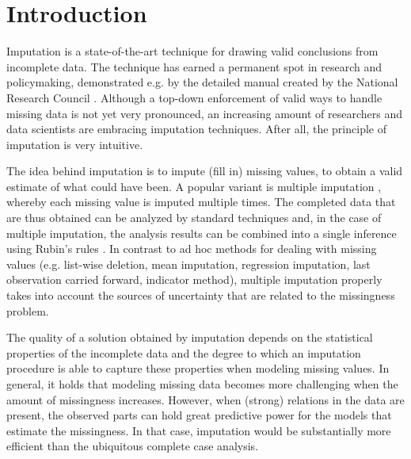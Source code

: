 \documentclass[bimj,fleqn]{w-art}
\begin{document}






\section{Introduction}

Imputation is a state-of-the-art technique for drawing valid conclusions from incomplete data. The technique has earned a permanent spot in research and policymaking, demonstrated e.g. by the detailed manual created by the National Research Council \citep*{little2012prevention}. Although a top-down enforcement of valid ways to handle missing data is not yet very pronounced, an increasing amount of researchers and data scientists are embracing imputation techniques. After all, the principle of imputation is very intuitive.

The idea behind imputation is to impute (fill in) missing values, to obtain a valid estimate of what could have been. A popular variant is multiple imputation \citep{rubi76}, whereby each missing value is imputed multiple times. The completed data that are thus obtained can be analyzed by standard techniques and, in the case of multiple imputation, the analysis results can be combined into a single inference using Rubin's rules \citep[][p. 76]{rubi87}. In contrast to ad hoc methods for dealing with missing values (e.g. list-wise deletion, mean imputation, regression imputation, last observation carried forward, indicator method), multiple imputation properly takes into account the sources of uncertainty that are related to the missingness problem. 

The quality of a solution obtained by imputation depends on the statistical properties of the incomplete data and the degree to which an imputation procedure is able to capture these properties when modeling missing values. In general, it holds that modeling missing data becomes more challenging when the amount of missingness increases. However, when (strong) relations in the data are present, the observed parts can hold great predictive power for the models that estimate the missingness. In that case, imputation would be substantially more efficient than the ubiquitous complete case analysis.
\end{document}

